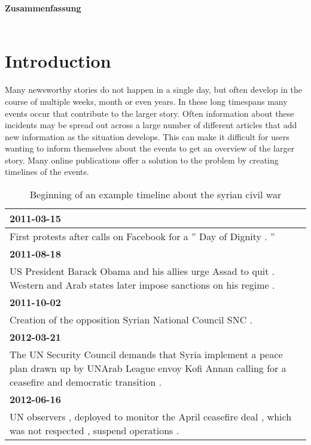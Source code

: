 \documentclass[a4paper,BCOR=10mm]{report}
\numberwithin{lemma}{chapter}
\numberwithin{definition}{chapter}
\begin{document}
\begin{titlepage}
\newpage
\noindent
\Large\textbf{Zusammenfassung}\\
\\

\newpage
\normalsize
\tableofcontents

\end{titlepage}



\chapter{Introduction}

Many newsworthy stories do not happen in a single day, but often develop in the course of multiple weeks, month or even years. In these long timespans many events occur that contribute to the larger story. Often information about these incidents may be spread out across a large number of different articles that add new information as the situation develops. This can make it difficult for users wanting to inform themselves about the events to get an overview of the larger story. Many online publications offer a solution to the problem by creating timelines of the events.

\begin{table}
\begin{tabularx}{\textwidth}{|X|}
\textbf{2011-03-15} \\\hline
First protests after calls on Facebook for a '' Day of Dignity . '' \\\hline
\textbf{2011-08-18} \\\hline
US President Barack Obama and his allies urge Assad to quit . \newline Western and Arab states later impose sanctions on his regime . \\\hline
\textbf{2011-10-02} \\\hline
Creation of the opposition Syrian National Council SNC . \\\hline
\textbf{2012-03-21} \\\hline
The UN Security Council demands that Syria implement a peace plan drawn up by UNArab League envoy Kofi Annan calling for a ceasefire and democratic transition . \\\hline
\textbf{2012-06-16} \\\hline
UN observers , deployed to monitor the April ceasefire deal , which was not respected , suspend operations . \\\hline
\end{tabularx}
\caption{Beginning of an example timeline about the syrian civil war}
\label{tab:example-tl}
\end{table}
\end{document}
